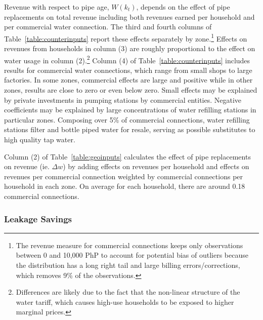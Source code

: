 \documentclass[12pt,table]{article}
\begin{document}
Revenue with respect to pipe age, $W(k_{t})$, depends on the effect of pipe replacements on total revenue including both revenues earned per household and per commercial water connection.  The third and fourth columns of Table~\ref{table:counterinputs} report these effects separately by zone.\footnote{The revenue measure for commercial connections keeps only observations between 0 and 10,000 PhP to account for potential bias of outliers because the distribution has a long right tail and large billing errors/corrections, which removes 9\% of the observations.}  Effects on revenues from households in column (3) are roughly proportional to the effect on water usage in column (2).\footnote{Differences are likely due to the fact that the non-linear structure of the water tariff, which causes high-use households to be exposed to higher marginal prices.}  Column (4) of Table~\ref{table:counterinputs} includes results for commercial water connections, which range from small shops to large factories.  In some zones, commercial effects are large and positive while in other zones, results are close to zero or even below zero.  Small effects may be explained by private investments in pumping stations by commercial entities.  Negative coefficients may be explained by large concentrations of water refilling stations in particular zones.  Composing over 5\% of commercial connections, water refilling stations filter and bottle piped water for resale, serving as possible substitutes to high quality tap water.  

Column (2) of Table~\ref{table:geoinputs} calculates the effect of pipe replacements on revenue (ie. $\Delta w$) by adding effects on revenues per household and effects on revenues per commercial connection weighted by commercial connections per household in each zone.  On average for each household, there are around 0.18 commercial connections.

\subsubsection{Leakage Savings}
\end{document}
